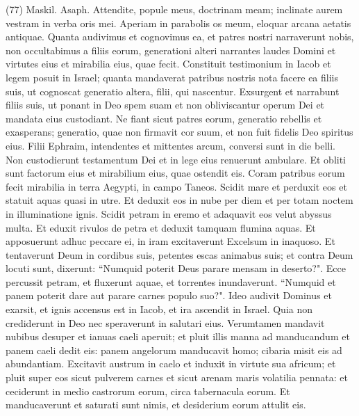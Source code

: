 \begin{biblechapter}  (77) 
\verse  Maskil. Asaph. Attendite, popule meus, doctrinam meam; inclinate aurem vestram in verba oris mei. 
\verse Aperiam in parabolis os meum, eloquar arcana aetatis antiquae. 
\verse Quanta audivimus et cognovimus ea, et patres nostri narraverunt nobis, 
\verse non occultabimus a filiis eorum, generationi alteri narrantes laudes Domini et virtutes eius et mirabilia eius, quae fecit. 
\verse Constituit testimonium in Iacob et legem posuit in Israel; quanta mandaverat patribus nostris nota facere ea filiis suis, 
\verse ut cognoscat generatio altera, filii, qui nascentur. Exsurgent et narrabunt filiis suis, 
\verse ut ponant in Deo spem suam et non obliviscantur operum Dei et mandata eius custodiant. 
\verse Ne fiant sicut patres eorum, generatio rebellis et exasperans; generatio, quae non firmavit cor suum, et non fuit fidelis Deo spiritus eius. 
\verse Filii Ephraim, intendentes et mittentes arcum, conversi sunt in die belli. 
\verse Non custodierunt testamentum Dei et in lege eius renuerunt ambulare. 
\verse Et obliti sunt factorum eius et mirabilium eius, quae ostendit eis. 
\verse Coram patribus eorum fecit mirabilia in terra Aegypti, in campo Taneos. 
\verse Scidit mare et perduxit eos et statuit aquas quasi in utre. 
\verse Et deduxit eos in nube per diem et per totam noctem in illuminatione ignis. 
\verse Scidit petram in eremo et adaquavit eos velut abyssus multa. 
\verse Et eduxit rivulos de petra et deduxit tamquam flumina aquas. 
\verse Et apposuerunt adhuc peccare ei, in iram excitaverunt Excelsum in inaquoso. 
\verse Et tentaverunt Deum in cordibus suis, petentes escas animabus suis; 
\verse et contra Deum locuti sunt, dixerunt: “Numquid poterit Deus parare mensam in deserto?". 
\verse Ecce percussit petram, et fluxerunt aquae, et torrentes inundaverunt. “Numquid et panem poterit dare aut parare carnes populo suo?". 
\verse Ideo audivit Dominus et exarsit, et ignis accensus est in Iacob, et ira ascendit in Israel. 
\verse Quia non crediderunt in Deo nec speraverunt in salutari eius. 
\verse Verumtamen mandavit nubibus desuper et ianuas caeli aperuit; 
\verse et pluit illis manna ad manducandum et panem caeli dedit eis: 
\verse panem angelorum manducavit homo; cibaria misit eis ad abundantiam. 
\verse Excitavit austrum in caelo et induxit in virtute sua africum; 
\verse et pluit super eos sicut pulverem carnes et sicut arenam maris volatilia pennata: 
\verse et ceciderunt in medio castrorum eorum, circa tabernacula eorum. 
\verse Et manducaverunt et saturati sunt nimis, et desiderium eorum attulit eis. 

\end{biblechapter}
